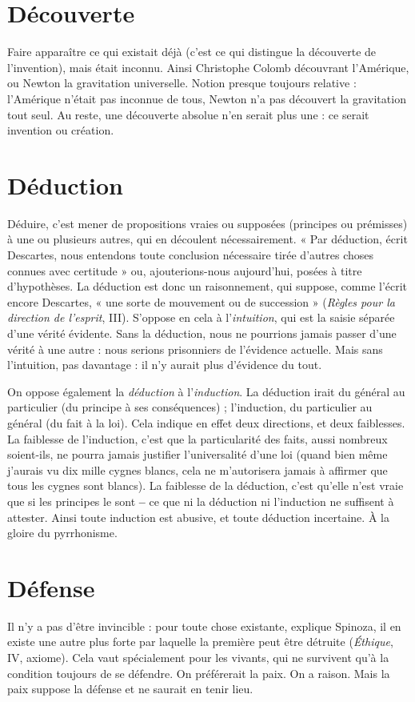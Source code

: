 \section{Découverte}
Faire apparaître ce qui existait déjà (c’est ce qui distingue
la découverte de l'invention), mais était inconnu. Ainsi
Christophe Colomb découvrant l'Amérique, ou Newton la gravitation universelle.
Notion presque toujours relative : l'Amérique n’était pas inconnue de
tous, Newton n’a pas découvert la gravitation tout seul. Au reste, une découverte
absolue n’en serait plus une : ce serait invention ou création.

\section{Déduction}
Déduire, c’est mener de propositions vraies ou supposées
(principes ou prémisses) à une ou plusieurs autres, qui en
découlent nécessairement. « Par déduction, écrit Descartes, nous entendons
toute conclusion nécessaire tirée d’autres choses connues avec certitude » ou,
ajouterions-nous aujourd’hui, posées à titre d’hypothèses. La déduction est
donc un raisonnement, qui suppose, comme l'écrit encore Descartes, « une
sorte de mouvement ou de succession » ({\it Règles pour la direction de l'esprit}, III).
S’oppose en cela à l’{\it intuition}, qui est la saisie séparée d’une vérité évidente. Sans
la déduction, nous ne pourrions jamais passer d’une vérité à une autre : nous
serions prisonniers de l’évidence actuelle. Mais sans l'intuition, pas davantage :
il n’y aurait plus d’évidence du tout.

On oppose également la {\it déduction} à l'{\it induction}. La déduction irait du
général au particulier (du principe à ses conséquences) ; l'induction, du particulier
au général (du fait à la loi). Cela indique en effet deux directions, et deux
faiblesses. La faiblesse de l’induction, c’est que la particularité des faits, aussi
nombreux soient-ils, ne pourra jamais justifier l’universalité d’une loi (quand
bien même j'aurais vu dix mille cygnes blancs, cela ne m’autorisera jamais à
affirmer que tous les cygnes sont blancs). La faiblesse de la déduction, c’est
qu’elle n’est vraie que si les principes le sont {\bf --} ce que ni la déduction ni l’induction
ne suffisent à attester. Ainsi toute induction est abusive, et toute déduction
incertaine. À la gloire du pyrrhonisme.

\section{Défense}
Il n’y a pas d’être invincible : pour toute chose existante, explique
Spinoza, il en existe une autre plus forte par laquelle la première
peut être détruite ({\it Éthique}, IV, axiome). Cela vaut spécialement pour les
vivants, qui ne survivent qu’à la condition toujours de se défendre. On préférerait
la paix. On a raison. Mais la paix suppose la défense et ne saurait en tenir
lieu.

